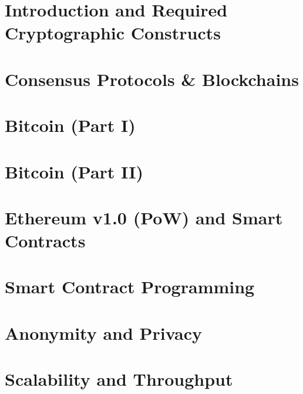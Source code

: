 \documentclass[a4paper,12pt,openany]{article}
\begin{document}
\section{Introduction and Required Cryptographic Constructs}\label{sec:intro}

\newpage

\section{Consensus Protocols \& Blockchains}\label{sec:consensus-protocols-blockchains}

\newpage

\section{Bitcoin (Part I)}\label{chapter-3-bitcoin-part-1}

\newpage

\section{Bitcoin (Part II)}\label{chapter-3-bitcoin-part-2}

\newpage

\section{Ethereum v1.0 (PoW) and Smart Contracts}\label{chapter-4-Eth1}

\newpage

\section{Smart Contract Programming}\label{chapter-6-smart-contract-programming}

\newpage

\section{Anonymity and Privacy}\label{chapter-6-anonoymity}

\newpage

\section{Scalability and Throughput}\label{chapter-6-scalability}

\newpage

\end{document}
